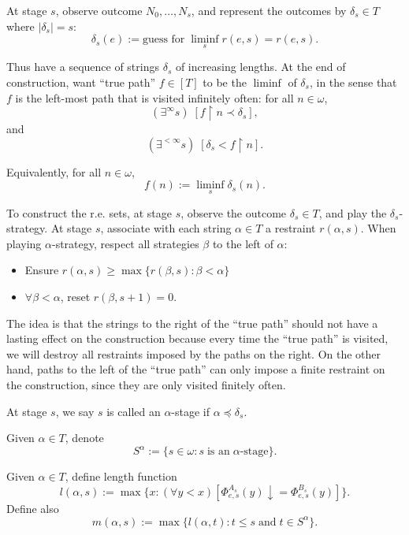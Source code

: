   At stage $s$, observe outcome $N_0,\ldots,N_s$, and represent the
  outcomes by $\delta_s\in T$ where $|\delta_s|=s$:
  \[\delta_s(e) :=\text{guess for}\; \liminf_s r(e,s) =r(e,s).\]
  
  Thus have a sequence of strings $\delta_s$ of increasing lengths. At the
  end of construction, want ``true path'' $f\in[T]$ to be the $\liminf$ of
  $\delta_s$, in the sense that $f$ is the left-most path that is visited
  infinitely often: for all $n\in\omega$,
  \[(\exists^\infty s)\; [f\restriction n \prec
  \delta_s],\]
  and
  \[(\exists^{<\infty} s)\; [\delta_s < f\restriction n].\]

  Equivalently, for all $n\in\omega$,
  \[f(n) :=\liminf_s \delta_s(n).\]

  To construct the r.e. sets, at stage $s$, observe the outcome
  $\delta_s\in T$, and play the $\delta_s$-strategy. At stage $s$,
  associate with each string $\alpha\in T$ a restraint $r(\alpha,s)$.
  When playing $\alpha$-strategy, respect all strategies $\beta$ to the
  left of $\alpha$:
  \begin{itemize}
    \item Ensure $r(\alpha,s) \geq \max\{r(\beta,s): \beta<\alpha\}$
    \item $\forall\beta<\alpha$, reset $r(\beta,s+1)=0$.
  \end{itemize}

  The idea is that the strings to the right of the ``true path'' should not
  have a lasting effect on the construction because every time the ``true
  path'' is visited, we will destroy all restraints imposed by the paths on
  the right. On the other hand, paths to the left of the ``true path'' can
  only impose a finite restraint on the construction, since they are only
  visited finitely often. \\

  \begin{definition}
    At stage $s$, we say $s$ is called an $\alpha$-stage if
    $\alpha\preceq\delta_s$.
  \end{definition}

  \begin{definition}
    Given $\alpha\in T$, denote
    \[S^\alpha := \{s\in\omega: s\; \text{is an}\; \alpha\text{-stage}\}.\]
  \end{definition}

  \begin{definition}
    Given $\alpha\in T$, define length function
    \[l(\alpha,s) := \max\{x: (\forall y<x) [\Phi_{e,s}^{A_s}(y)
      \downarrow =\Phi_{e,s}^{B_s}(y)]\}.\]
    Define also
    \[m(\alpha,s) := \max\{l(\alpha,t): t\leq s\; \text{and}\; t\in
    S^{\alpha}\}.\]
  \end{definition}

